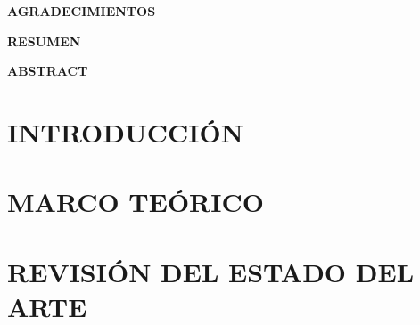\documentclass[12pt,openany]{report}
\begin{document}
    
	\setcounter{page}{2} %
	\begin{center}
		 \label{glads}
		\large{\textbf{AGRADECIMIENTOS}}
	\end{center}
	
	\clearpage
    \begin{center}
		 \label{resumen}
		\large{\textbf{RESUMEN}}
	\end{center}
	
	\clearpage
    \begin{center}
		 \label{abstract}
		\large{\textbf{ABSTRACT}}
	\end{center}
	
	\clearpage
	\renewcommand{\cfttoctitlefont}{\large}
	\renewcommand{\contentsname}{\textbf{TABLA DE CONTENIDOS}}
	\tableofcontents 
	\newpage
	\renewcommand\cftloftitlefont{\large}
	\renewcommand{\listfigurename}{\textbf{ÍNDICE DE FIGURAS}}
	{%
		\let\oldnumberline\numberline%
		\renewcommand{\numberline}{\figurename~\oldnumberline}%
		\listoffigures%
	}
	\newpage
	\renewcommand\cftlottitlefont{\large}
	\renewcommand{\listtablename}{\textbf{ÍNDICE DE TABLAS}}
	{%
		\let\oldnumberline\numberline%
		\renewcommand{\numberline}{\tablename~\oldnumberline}%
		\listoftables%
	}
	\newpage
	\setcounter{page}{1} %
	\chapternumberfont{\huge}
	\chaptertitlefont{\large}
	\chapter{INTRODUCCIÓN} \label{intr}
	

	\chapter{MARCO TEÓRICO} \label{cap2}
	
	\chapter{REVISIÓN DEL ESTADO DEL ARTE} \label{cap4}
	
\end{document}
